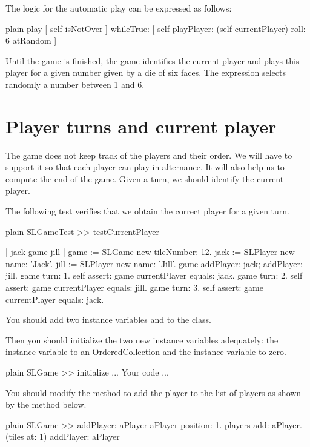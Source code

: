 \documentclass[10pt,twoside,english]{_support/latex/sbabook/sbabook}
\begin{document}
The logic for the automatic play can be expressed as follows:

\begin{displaycode}{plain}
play
	[ self isNotOver ] whileTrue: [
		self playPlayer: (self currentPlayer) roll: 6 atRandom ]
\end{displaycode}

Until the game is finished, the game identifies the current player and plays this player for a given number given by a die of six faces. The expression  selects randomly a number between 1 and 6. 
\section{Player turns and current player}
The game does not keep track of the players and their order.
We will have to support it so that each player can play in alternance. It will also help us to compute the end of the game. Given a turn, we should identify the current player.

The following test verifies that we obtain the correct player for a given turn.

\begin{displaycode}{plain}
SLGameTest >> testCurrentPlayer
	
	| jack game jill |
	game := SLGame new tileNumber: 12.
	jack := SLPlayer new name: 'Jack'.
	jill := SLPlayer new name: 'Jill'.
	game addPlayer: jack; addPlayer: jill. 
	game turn: 1.
	self assert: game currentPlayer equals: jack. 
	game turn: 2.
	self assert: game currentPlayer equals: jill. 
	game turn: 3.
	self assert: game currentPlayer equals: jack. 
\end{displaycode}

You should add two instance variables  and  to the  class. 

Then you should initialize the two new instance variables adequately: the  instance variable to an OrderedCollection and the  instance variable to zero. 

\begin{displaycode}{plain}
SLGame >> initialize
	... Your code ...
\end{displaycode}

You should modify the method  to add the player to the list of players as shown by the method below.

\begin{displaycode}{plain}
SLGame >> addPlayer: aPlayer
	aPlayer position: 1.
	players add: aPlayer. 
	(tiles at: 1) addPlayer: aPlayer
\end{displaycode}
\end{document}
